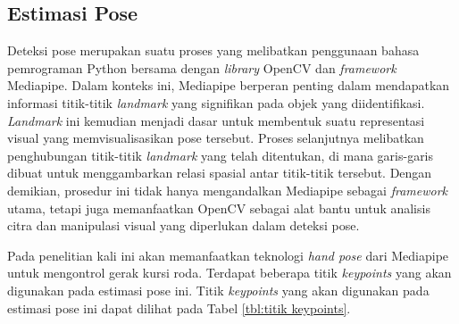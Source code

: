 \subsection{Estimasi Pose}
Deteksi pose merupakan suatu proses yang melibatkan penggunaan bahasa pemrograman Python bersama dengan \emph{library} OpenCV dan \emph{framework} Mediapipe. Dalam konteks ini, Mediapipe berperan penting dalam mendapatkan informasi titik-titik \emph{landmark} yang signifikan pada objek yang diidentifikasi. \emph{Landmark} ini kemudian menjadi dasar untuk membentuk suatu representasi visual yang memvisualisasikan pose tersebut. Proses selanjutnya melibatkan penghubungan titik-titik \emph{landmark} yang telah ditentukan, di mana garis-garis dibuat untuk menggambarkan relasi spasial antar titik-titik tersebut. Dengan demikian, prosedur ini tidak hanya mengandalkan Mediapipe sebagai \emph{framework} utama, tetapi juga memanfaatkan OpenCV sebagai alat bantu untuk analisis citra dan manipulasi visual yang diperlukan dalam deteksi pose.

Pada penelitian kali ini akan memanfaatkan teknologi \emph{hand pose} dari Mediapipe untuk mengontrol gerak kursi roda. Terdapat beberapa titik \emph{keypoints} yang akan digunakan pada estimasi pose ini. Titik \emph{keypoints} yang akan digunakan pada estimasi  pose ini dapat dilihat pada Tabel \ref{tbl:titik keypoints}.

